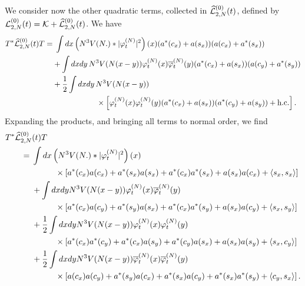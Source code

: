 \documentclass[11pt,a4paper]{article}
\newcommand{\cK}{{\cal K}}
\newcommand{\cL}{{\cal L}}
\begin{document}
We consider now the other quadratic terms, collected in $\widehat{\cL}^{(0)}_{2,N} (t)$, defined by $\cL^{(0)}_{2,N} (t) = \cK + \widehat{\cL}_{2,N}^{(0)} (t)$. 
We have
\[ \begin{split} 
T^* \widehat{\cL}_{2,N}^{(0)} (t) T = & \; \int dx \left( N^3 V (N .) * |\varphi_t^{(N)}|^2 \right) (x) (a^* (c_x) + a(s_x)) (a(c_x) + a^* (s_x)) \\ & + \int dx dy \, N^3 V(N(x-y)) \varphi_t^{(N)} (x) \overline{\varphi}_t^{(N)} (y) (a^* (c_x) + a(s_x)) (a (c_y) + a^* (s_y)) \\ &+ \frac{1}{2} \int dx dy \, N^3 V(N (x-y)) \\
&\hspace{2cm} \times \left[  \varphi_t^{(N)} (x) \varphi_t^{(N)} (y) (a^* (c_x) + a(s_x)) (a^* (c_y) + a (s_y)) + \text{h.c.}  \right]. 
\end{split} \]
Expanding the products, and bringing all terms to normal order, we find
\begin{equation}\label{eq:T2T} \begin{split} 
T^*  \widehat{\cL}_{2,N}^{(0)}& (t) T \\ =\; & \int dx \left(N^3 V (N .) * |\varphi_t^{(N)}|^2 \right) (x) \\ &\hspace{1cm}\times \left[  a^* (c_x) a (c_x) + a^* (s_x) a (s_x) + a^* (c_x) a^* (s_x) + a(s_x) a(c_x) + \langle s_x , s_x \rangle \right] \\
&+ \int dx dy N^3 V (N (x-y)) \varphi_t^{(N)} (x) \overline{\varphi}_t^{(N)} (y) \\ &\hspace{1cm}\times  \left[ a^* (c_x) a(c_y) + a^* (s_y) a(s_x) + a^* (c_x) a^* (s_y) + a(s_x) a(c_y) + \langle s_x , s_y \rangle \right] \\
&+ \frac{1}{2} \int dx dy N^3 V(N (x-y)) \varphi_t^{(N)} (x) \varphi_t^{(N)} (y) \\ &\hspace{1cm}\times \left[ a^* (c_x) a^* (c_y) + a^* (c_x) a(s_y) + a^* (c_y) a (s_x) + a(s_x) a(s_y) + \langle s_x , c_y \rangle \right] \\
&+ \frac{1}{2} \int dx dy N^3 V(N (x-y)) \overline{\varphi}_t^{(N)} (x) \overline{\varphi}_t^{(N)} (y) \\ &\hspace{1cm}\times \left[ a (c_x) a (c_y) + a^* (s_y) a(c_x) +  a^* (s_x) a(c_y) + a^* (s_x) a^* (s_y) + \langle c_y , s_x \rangle \right]. 
\end{split} \end{equation}
\end{document}
